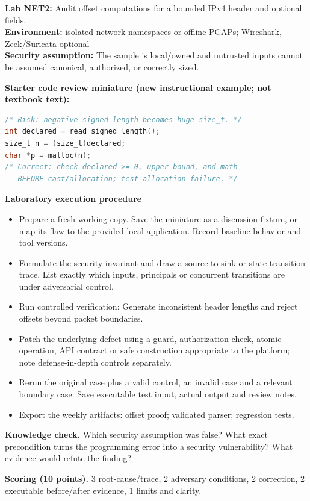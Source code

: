 \documentclass[10pt,letterpaper]{article}
\begin{document}
\begin{insight}\textbf{Lab NET2:} Audit offset computations for a bounded IPv4 header and optional fields.\\\textbf{Environment:} isolated network namespaces or offline PCAPs; Wireshark, Zeek/Suricata optional\\\textbf{Security assumption:} The sample is local/owned and untrusted inputs cannot be assumed canonical, authorized, or correctly sized.\end{insight}
\textbf{Starter code review miniature (new instructional example; not textbook text):}
\begin{lstlisting}[language=C]
/* Risk: negative signed length becomes huge size_t. */
int declared = read_signed_length();
size_t n = (size_t)declared;
char *p = malloc(n);
/* Correct: check declared >= 0, upper bound, and math
   BEFORE cast/allocation; test allocation failure. */
\end{lstlisting}
\textbf{Laboratory execution procedure}
\begin{itemize}[leftmargin=*,itemsep=2pt]
\item Prepare a fresh working copy. Save the miniature as a discussion fixture, or map its flaw to the provided local application. Record baseline behavior and tool versions.
\item Formulate the security invariant and draw a source-to-sink or state-transition trace. List exactly which inputs, principals or concurrent transitions are under adversarial control.
\item Run controlled verification: Generate inconsistent header lengths and reject offsets beyond packet boundaries.
\item Patch the underlying defect using a guard, authorization check, atomic operation, API contract or safe construction appropriate to the platform; note defense-in-depth controls separately.
\item Rerun the original case plus a valid control, an invalid case and a relevant boundary case. Save executable test input, actual output and review notes.
\item Export the weekly artifacts: offset proof; validated parser; regression tests.
\end{itemize}
\textbf{Knowledge check.} Which security assumption was false? What exact precondition turns the programming error into a security vulnerability? What evidence would refute the finding?

\textbf{Scoring (10 points).} 3 root-cause/trace, 2 adversary conditions, 2 correction, 2 executable before/after evidence, 1 limits and clarity.
\end{document}
